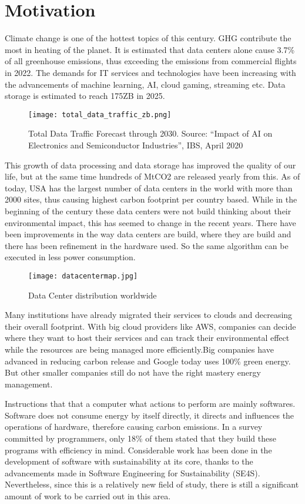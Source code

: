 \documentclass[
  a4paper,  %
  twoside,  %
  bibliography=totoc,
  headsepline,
  cleardoublepage=empty,
  parskip=half,
  draft=false
]{scrbook}
\begin{document}
\section{Motivation}
Climate change is one of the hottest topics of this century. GHG contribute the most in heating of the planet. It is estimated that data centers alone cause 3.7\% of all greenhouse emissions, thus exceeding the emissions from commercial flights in 2022. The demands for IT services and technologies have been increasing with the advancements of machine learning, AI, cloud gaming, streaming etc. Data storage is estimated to reach 175ZB in 2025\cite{zhou2021role}. 
\begin{figure}
	\centering
	\texttt{[image: total\_data\_traffic\_zb.png]}
	\caption{Total Data Traffic Forecast through 2030. Source: “Impact of AI on Electronics and Semiconductor Industries”, IBS, April 2020}
	\label{fig:chor1}
\end{figure}
This growth of data processing and data storage has improved the quality of our life, but at the same time hundreds of MtCO2 are released yearly from this. As of today, USA has the largest number of data centers in the world with more than 2000 sites, thus causing highest carbon footprint per country based. While in the beginning of the century these data centers were not build thinking about their environmental impact, this has seemed to change in the recent years. There have been improvements in the way data centers are build, where they are build and there has been refinement in the hardware used. So the same algorithm can be executed in less power consumption. 
\begin{figure}
	\centering
	\texttt{[image: datacentermap.jpg]}
	\caption{Data Center distribution worldwide}
	\label{fig:chor1}
\end{figure}
Many institutions have already migrated their services to clouds and decreasing their overall footprint. With big cloud providers like AWS, companies can decide where they want to host their services and can track their environmental effect while the resources are being managed more efficiently.Big companies have advanced in reducing carbon release and Google today uses 100\% green energy. But other smaller companies still do not have the right mastery energy management. 

Instructions that that a computer what actions to perform are mainly softwares\cite{Britannica_2024}. Software does not consume energy by itself directly, it directs and influences the operations of hardware, therefore causing carbon emissions. In a survey committed by programmers, only 18\% of them stated that they build these programs with efficiency in mind. Considerable work has been done in the development of software with sustainability at its core, thanks to the advancements made in Software Engineering for Sustainability (SE4S). Nevertheless, since this is a relatively new field of study, there is still a significant amount of work to be carried out in this area.
\end{document}
